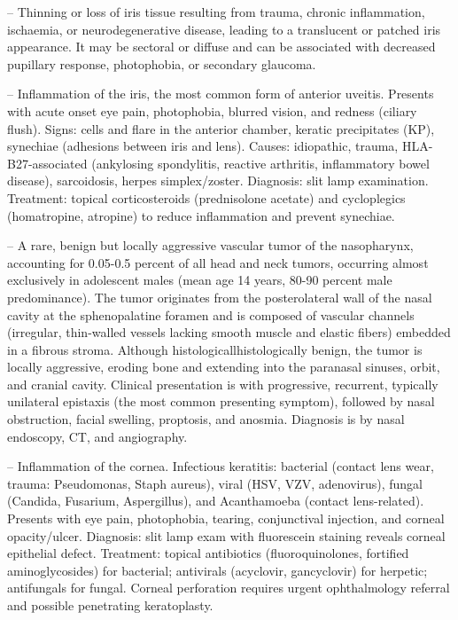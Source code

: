 -- Thinning or loss of iris tissue resulting from trauma, chronic inflammation, ischaemia, or neurodegenerative disease, leading to a translucent or patched iris appearance. It may be sectoral or diffuse and can be associated with decreased pupillary response, photophobia, or secondary glaucoma.

-- Inflammation of the iris, the most common form of anterior uveitis. Presents with acute onset eye pain, photophobia, blurred vision, and redness (ciliary flush). Signs: cells and flare in the anterior chamber, keratic precipitates (KP), synechiae (adhesions between iris and lens). Causes: idiopathic, trauma, HLA-B27-associated (ankylosing spondylitis, reactive arthritis, inflammatory bowel disease), sarcoidosis, herpes simplex/zoster. Diagnosis: slit lamp examination. Treatment: topical corticosteroids (prednisolone acetate) and cycloplegics (homatropine, atropine) to reduce inflammation and prevent synechiae.

-- A rare, benign but locally aggressive vascular tumor of the nasopharynx, accounting for 0.05-0.5 percent of all head and neck tumors, occurring almost exclusively in adolescent males (mean age 14 years, 80-90 percent male predominance). The tumor originates from the posterolateral wall of the nasal cavity at the sphenopalatine foramen and is composed of vascular channels (irregular, thin-walled vessels lacking smooth muscle and elastic fibers) embedded in a fibrous stroma. Although histologicallhistologically benign, the tumor is locally aggressive, eroding bone and extending into the paranasal sinuses, orbit, and cranial cavity. Clinical presentation is with progressive, recurrent, typically unilateral epistaxis (the most common presenting symptom), followed by nasal obstruction, facial swelling, proptosis, and anosmia. Diagnosis is by nasal endoscopy, CT, and angiography.

-- Inflammation of the cornea. Infectious keratitis: bacterial (contact lens wear, trauma: Pseudomonas, Staph aureus), viral (HSV, VZV, adenovirus), fungal (Candida, Fusarium, Aspergillus), and Acanthamoeba (contact lens-related). Presents with eye pain, photophobia, tearing, conjunctival injection, and corneal opacity/ulcer. Diagnosis: slit lamp exam with fluorescein staining reveals corneal epithelial defect. Treatment: topical antibiotics (fluoroquinolones, fortified aminoglycosides) for bacterial; antivirals (acyclovir, gancyclovir) for herpetic; antifungals for fungal. Corneal perforation requires urgent ophthalmology referral and possible penetrating keratoplasty.

